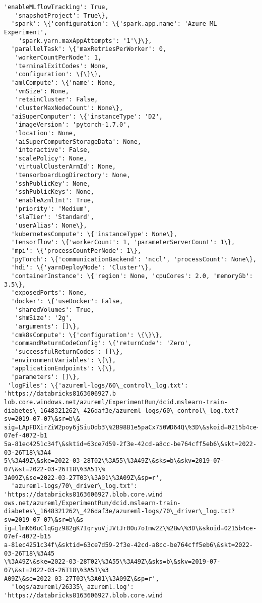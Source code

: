 \documentclass[11pt]{article}
\begin{document}
\begin{tcolorbox}[breakable, size=fbox, boxrule=.5pt, pad at break*=1mm, opacityfill=0]
\begin{Verbatim}[commandchars=\\\{\}]
   'enableMLflowTracking': True,
   'snapshotProject': True\},
  'spark': \{'configuration': \{'spark.app.name': 'Azure ML Experiment',
    'spark.yarn.maxAppAttempts': '1'\}\},
  'parallelTask': \{'maxRetriesPerWorker': 0,
   'workerCountPerNode': 1,
   'terminalExitCodes': None,
   'configuration': \{\}\},
  'amlCompute': \{'name': None,
   'vmSize': None,
   'retainCluster': False,
   'clusterMaxNodeCount': None\},
  'aiSuperComputer': \{'instanceType': 'D2',
   'imageVersion': 'pytorch-1.7.0',
   'location': None,
   'aiSuperComputerStorageData': None,
   'interactive': False,
   'scalePolicy': None,
   'virtualClusterArmId': None,
   'tensorboardLogDirectory': None,
   'sshPublicKey': None,
   'sshPublicKeys': None,
   'enableAzmlInt': True,
   'priority': 'Medium',
   'slaTier': 'Standard',
   'userAlias': None\},
  'kubernetesCompute': \{'instanceType': None\},
  'tensorflow': \{'workerCount': 1, 'parameterServerCount': 1\},
  'mpi': \{'processCountPerNode': 1\},
  'pyTorch': \{'communicationBackend': 'nccl', 'processCount': None\},
  'hdi': \{'yarnDeployMode': 'Cluster'\},
  'containerInstance': \{'region': None, 'cpuCores': 2.0, 'memoryGb': 3.5\},
  'exposedPorts': None,
  'docker': \{'useDocker': False,
   'sharedVolumes': True,
   'shmSize': '2g',
   'arguments': []\},
  'cmk8sCompute': \{'configuration': \{\}\},
  'commandReturnCodeConfig': \{'returnCode': 'Zero',
   'successfulReturnCodes': []\},
  'environmentVariables': \{\},
  'applicationEndpoints': \{\},
  'parameters': []\},
 'logFiles': \{'azureml-logs/60\_control\_log.txt': 'https://databricks8163606927.b
lob.core.windows.net/azureml/ExperimentRun/dcid.mslearn-train-
diabetes\_1648321262\_426daf3e/azureml-logs/60\_control\_log.txt?sv=2019-07-07\&sr=b\&
sig=LApFDXirZiW2poy6jSiuOdb3\%2B98B1e5paCx750WD64Q\%3D\&skoid=0215b4ce-07ef-4072-b1
5a-81ec4251c34f\&sktid=63ce7d59-2f3e-42cd-a8cc-be764cff5eb6\&skt=2022-03-26T18\%3A4
5\%3A49Z\&ske=2022-03-28T02\%3A55\%3A49Z\&sks=b\&skv=2019-07-07\&st=2022-03-26T18\%3A51\%
3A09Z\&se=2022-03-27T03\%3A01\%3A09Z\&sp=r',
  'azureml-logs/70\_driver\_log.txt': 'https://databricks8163606927.blob.core.wind
ows.net/azureml/ExperimentRun/dcid.mslearn-train-
diabetes\_1648321262\_426daf3e/azureml-logs/70\_driver\_log.txt?sv=2019-07-07\&sr=b\&s
ig=LlmK60uClqGgz982gK7IqryuVjJVtJr0Ou7oImw2Z\%2Bw\%3D\&skoid=0215b4ce-07ef-4072-b15
a-81ec4251c34f\&sktid=63ce7d59-2f3e-42cd-a8cc-be764cff5eb6\&skt=2022-03-26T18\%3A45
\%3A49Z\&ske=2022-03-28T02\%3A55\%3A49Z\&sks=b\&skv=2019-07-07\&st=2022-03-26T18\%3A51\%3
A09Z\&se=2022-03-27T03\%3A01\%3A09Z\&sp=r',
  'logs/azureml/26335\_azureml.log': 'https://databricks8163606927.blob.core.wind

\end{Verbatim}
\end{tcolorbox}
\end{document}
